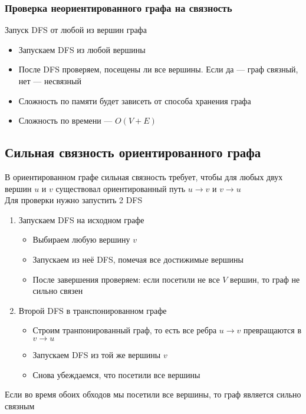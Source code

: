 \documentclass[a4paper]{article}
\begin{document}
\subsubsection*{Проверка неориентированного графа на связность}
Запуск DFS от любой из вершин графа
\begin{itemize}
    \item Запускаем DFS из любой вершины
    \item После DFS проверяем, посещены ли все вершины. Если да — граф связный, нет — несвязный
    \item Сложность по памяти будет зависеть от способа хранения графа
    \item Сложность по времени — $O(V+E)$
\end{itemize}

\subsection{Сильная связность ориентированного графа}
 В ориентированном графе сильная связность требует, чтобы для любых двух вершин $u$ и $v$ существовал ориентированный путь $u\rightarrow v$ и $v\rightarrow u$\\[2mm]
Для проверки нужно запустить 2 DFS
\begin{enumerate}
    \item Запускаем DFS на исходном графе
    \begin{itemize}
        \item Выбираем любую вершину $v$
        \item Запускаем из неё DFS, помечая все достижимые вершины
        \item После завершения проверяем: если посетили не все $V$ вершин, то граф не сильно связен
    \end{itemize}
    \item Второй DFS в транспонированном графе
    \begin{itemize}
        \item Строим транпонированный граф, то есть все ребра $u\rightarrow v$ превращаются в $v\rightarrow u$
        \item Запускаем DFS из той же вершины $v$
        \item Снова убеждаемся, что посетили все вершины
    \end{itemize}
\end{enumerate}
Если во время обоих обходов мы посетили все вершины, то граф является сильно связным
\end{document}
